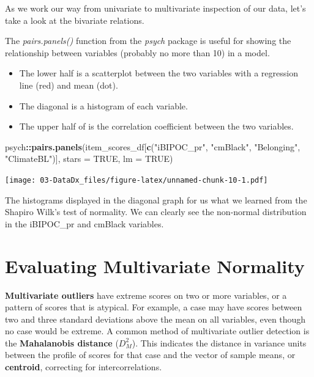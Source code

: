 \documentclass[
  11pt,
]{book}
\newenvironment{Shaded}{\begin{snugshade}}{\end{snugshade}}
\newcommand{\AttributeTok}[1]{\textcolor[rgb]{0.27,0.27,0.27}{#1}}
\newcommand{\ConstantTok}[1]{\textcolor[rgb]{0.37,0.37,0.37}{#1}}
\newcommand{\FunctionTok}[1]{\textcolor[rgb]{0.27,0.27,0.27}{\textbf{#1}}}
\newcommand{\NormalTok}[1]{#1}
\newcommand{\SpecialCharTok}[1]{\textcolor[rgb]{0.43,0.43,0.43}{\textbf{#1}}}
\newcommand{\StringTok}[1]{\textcolor[rgb]{0.5,0.5,0.5}{#1}}
\providecommand{\tightlist}{%
  \setlength{\itemsep}{0pt}\setlength{\parskip}{0pt}}
\begin{document}
As we work our way from univariate to multivariate inspection of our data, let's take a look at the bivariate relations.

The \emph{pairs.panels()} function from the \emph{psych} package is useful for showing the relationship between variables (probably no more than 10) in a model.

\begin{itemize}
\tightlist
\item
  The lower half is a scatterplot between the two variables with a regression line (red) and mean (dot).\\
\item
  The diagonal is a histogram of each variable.\\
\item
  The upper half of is the correlation coefficient between the two variables.
\end{itemize}

\begin{Shaded}
\begin{Highlighting}[]
\NormalTok{psych}\SpecialCharTok{::}\FunctionTok{pairs.panels}\NormalTok{(item\_scores\_df[}\FunctionTok{c}\NormalTok{(}\StringTok{"iBIPOC\_pr"}\NormalTok{, }\StringTok{"cmBlack"}\NormalTok{, }\StringTok{"Belonging"}\NormalTok{,}
    \StringTok{"ClimateBL"}\NormalTok{)], }\AttributeTok{stars =} \ConstantTok{TRUE}\NormalTok{, }\AttributeTok{lm =} \ConstantTok{TRUE}\NormalTok{)}
\end{Highlighting}
\end{Shaded}

\texttt{[image: 03-DataDx\_files/figure-latex/unnamed-chunk-10-1.pdf]}

The histograms displayed in the diagonal graph for us what we learned from the Shapiro Wilk's test of normality. We can clearly see the non-normal distribution in the iBIPOC\_pr and cmBlack variables.

\hypertarget{evaluating-multivariate-normality}{%
\section{Evaluating Multivariate Normality}\label{evaluating-multivariate-normality}}

\textbf{Multivariate outliers} have extreme scores on two or more variables, or a pattern of scores that is atypical. For example, a case may have scores between two and three standard deviations above the mean on all variables, even though no case would be extreme. A common method of multivariate outlier detection is the \textbf{Mahalanobis distance} (\(D_{M}^{2}\)). This indicates the distance in variance units between the profile of scores for that case and the vector of sample means, or \textbf{centroid}, correcting for intercorrelations.
\end{document}
